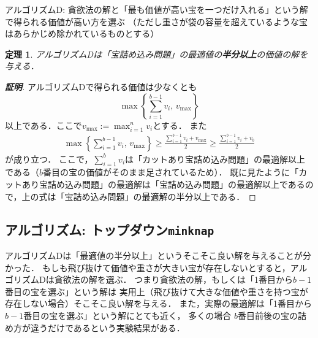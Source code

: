 \documentclass[a4paper,twoside,onecolumn,openany,article]{memoir}
\newtheorem{theorem}{定理}
\theoremstyle{remark}
\begin{document}
\vspace{1em}
\noindent
\hspace{2em} \parbox{0.9\hsize}{アルゴリズムD: 貪欲法の解と「最も価値が高い宝を一つだけ入れる」という解で得られる価値が高い方を選ぶ
（ただし重さが袋の容量を超えているような宝はあらかじめ除かれているものとする）}

\vspace{1em}

\begin{theorem}
アルゴリズム\textrm{D}は「宝詰め込み問題」の最適値の\textbf{半分以上}の価値の解を与える．
\end{theorem}
\begin{proof}[\textbf{証明}]
アルゴリズムDで得られる価値は少なくとも
\begin{equation*}
\max\left\{\sum_{i=1}^{b-1}v_i,\, v_{\max}\right\}
\end{equation*}
以上である．ここで$v_{\max}:=\max_{i=1}^n v_i$とする．
また
\begin{align*}
\max\left\{\sum_{i=1}^{b-1}v_i,\, v_{\max}\right\}
\ge
\frac{\sum_{i=1}^{b-1}v_i + v_{\max}}2
\ge
\frac{\sum_{i=1}^{b-1}v_i + v_b}2
\end{align*}
が成り立つ．
ここで，$\sum_{i=1}^b v_i$は「カットあり宝詰め込み問題」の最適解以上である（$b$番目の宝の価値がそのまま足されているため）．
既に見たように「カットあり宝詰め込み問題」の最適解は「宝詰め込み問題」の最適解以上であるので，上の式は「宝詰め込み問題」の最適解の半分以上である．
\end{proof}

\subsection{アルゴリズム: トップダウン\texttt{minknap}}
アルゴリズムDは「最適値の半分以上」というそこそこ良い解を与えることが分かった．
もしも飛び抜けて価値や重さが大きい宝が存在しないとすると，アルゴリズムDは貪欲法の解を選ぶ．
つまり貪欲法の解，もしくは「1番目から$b-1$番目の宝を選ぶ」という解は
実用上（飛び抜けて大きな価値や重さを持つ宝が存在しない場合）そこそこ良い解を与える．
また，実際の最適解は「1番目から$b-1$番目の宝を選ぶ」という解にとても近く，
多くの場合 $b$番目前後の宝の詰め方が違うだけであるという実験結果がある．
\end{document}
